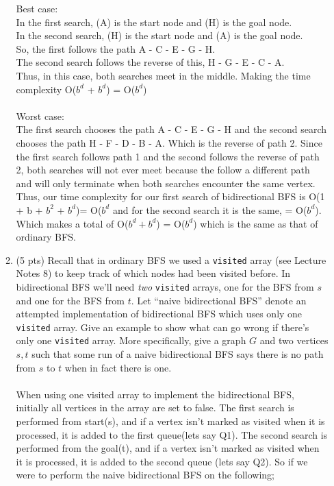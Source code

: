 \documentclass[12pt]{article}
\begin{document}
\begin{enumerate}
\begin{enumerate}
	Best case: \\
	In the first search, (A) is the start node and (H) is the goal node. \\	In the second search, (H) is the start node and (A) is the goal node. \\
	So, the first follows the path A - C - E - G - H. \\
	The second search follows the reverse of this, H - G - E - C - A.
	\\ Thus, in this case, both searches meet in the middle. Making the time complexity O($b^{d}$ + $b^{d}$) = O($b^{d}$) \\ \\
	 Worst case: \\
	 The first search chooses the path A - C - E - G - H and the second search chooses the path H - F - D - B - A. Which is the reverse of path 2. Since the first search follows path 1 and the second follows the reverse of path 2, both searches will not ever meet because the follow a different path and will only terminate when both searches encounter the same vertex. Thus, our time complexity for our first search of bidirectional BFS is O(1 + b + $b^{2}$ + $b^{d}$)= O($b^{d}$ and for the second search it is the same, = O($b^{d}$). Which makes a total of O($b^{d} + b^{d}$) = O($b^{d}$) which is the same as that of ordinary BFS.   
	
	\pagebreak
	
	\item \label{1b} (5 pts) Recall that in ordinary BFS we used a \texttt{visited} array (see Lecture Notes 8) to keep track of which nodes had been visited before. In bidirectional BFS we'll need \emph{two} \texttt{visited} arrays, one for the BFS from $s$ and one for the BFS from $t$. Let ``naive bidirectional BFS'' denote an attempted implementation of bidirectional BFS which uses only one {\tt visited} array.  Give an example to show what can go wrong if there's only one \texttt{visited} array. More specifically, give a graph $G$ and two vertices $s,t$ such that some run of a naive bidirectional BFS says there is no path from $s$ to $t$ when in fact there is one.\\
	\\ When using one visited array to implement the bidirectional BFS, initially all vertices in the array are set to false. The first search is performed from start(s), and if a vertex isn't marked as visited when it is processed, it is added to the first queue(lets say Q1). The second search is performed from the goal(t), and if a vertex isn't marked as visited when it is processed, it is added to the second queue (lets say Q2). So if we were to perform the naive bidirectional BFS on the following;
	

\end{enumerate}
\end{enumerate}
\end{document}
